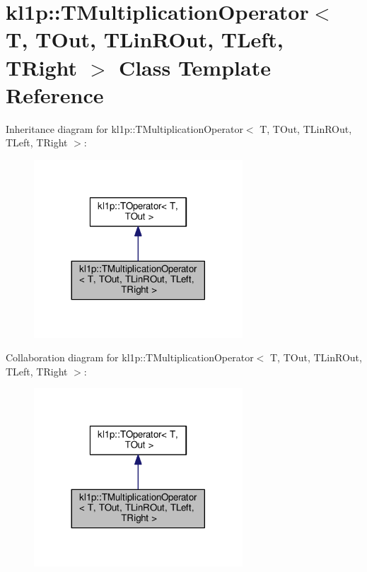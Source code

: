 \hypertarget{classkl1p_1_1TMultiplicationOperator}{}\section{kl1p\+:\+:T\+Multiplication\+Operator$<$ T, T\+Out, T\+Lin\+R\+Out, T\+Left, T\+Right $>$ Class Template Reference}
\label{classkl1p_1_1TMultiplicationOperator}


Inheritance diagram for kl1p\+:\+:T\+Multiplication\+Operator$<$ T, T\+Out, T\+Lin\+R\+Out, T\+Left, T\+Right $>$\+:
\nopagebreak
\begin{figure}[H]
\begin{center}
\leavevmode
\includegraphics[width=221pt]{classkl1p_1_1TMultiplicationOperator__inherit__graph}
\end{center}
\end{figure}


Collaboration diagram for kl1p\+:\+:T\+Multiplication\+Operator$<$ T, T\+Out, T\+Lin\+R\+Out, T\+Left, T\+Right $>$\+:
\nopagebreak
\begin{figure}[H]
\begin{center}
\leavevmode
\includegraphics[width=221pt]{classkl1p_1_1TMultiplicationOperator__coll__graph}
\end{center}
\end{figure}

